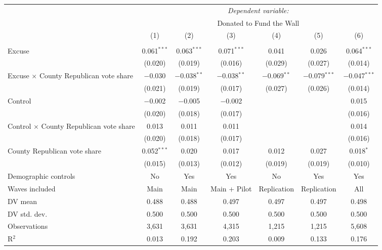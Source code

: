 
\begin{table}[!htbp] \centering 
  \label{t:2-cityheterogeneity} 
\begin{threeparttable}
\begin{tabular}{@{\hspace{5pt}}l@{\hspace{5pt}}cccccc} 
\toprule 
 & \multicolumn{6}{c}{\textit{Dependent variable:}} \\ 
\cmidrule(rr){2-7} 
 & \multicolumn{6}{c}{Donated to Fund the Wall} \\ 
 \cmidrule(rr){2-7}
 & (1) & (2) & (3) & (4) & (5) & (6)\\ 
\midrule  
\\[-2.1ex] Excuse & 0.061$^{***}$ & 0.063$^{***}$ & 0.071$^{***}$ & 0.041 & 0.026 & 0.064$^{***}$ \\ 
  & (0.020) & (0.019) & (0.016) & (0.029) & (0.027) & (0.014) \\ 
 \addlinespace 
 Excuse $\times$ County Republican vote share & $-$0.030 & $-$0.038$^{**}$ & $-$0.038$^{**}$ & $-$0.069$^{**}$ & $-$0.079$^{***}$ & $-$0.047$^{***}$ \\ 
  & (0.021) & (0.019) & (0.017) & (0.027) & (0.026) & (0.014) \\ 
 \addlinespace 
 Control & $-$0.002 & $-$0.005 & $-$0.002 &  &  & 0.015 \\ 
  & (0.020) & (0.018) & (0.017) &  &  & (0.016) \\ 
 \addlinespace 
 Control $\times$ County Republican vote share & 0.013 & 0.011 & 0.011 &  &  & 0.014 \\ 
  & (0.020) & (0.018) & (0.017) &  &  & (0.016) \\ 
 \addlinespace 
 County Republican vote share & 0.052$^{***}$ & 0.020 & 0.017 & 0.012 & 0.027 & 0.018$^{*}$ \\ 
  & (0.015) & (0.013) & (0.012) & (0.019) & (0.019) & (0.010) \\ 
 \addlinespace 
\midrule  
Demographic controls & No & Yes & Yes & No & Yes & Yes \\ 
Waves included & Main & Main & Main + Pilot & Replication & Replication & All \\ 
\midrule
DV mean & 0.488 & 0.488 & 0.497 & 0.497 & 0.497 & 0.498 \\
DV std. dev. & 0.500 & 0.500 & 0.500 & 0.500 & 0.500 & 0.500 \\
Observations & 3,631 & 3,631 & 4,315 & 1,215 & 1,215 & 5,608 \\ 
R$^{2}$ & 0.013 & 0.192 & 0.203 & 0.009 & 0.133 & 0.176 \\ 
\bottomrule 
\end{tabular} 
\end{threeparttable}
\end{table} 
